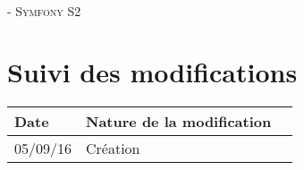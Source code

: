 \documentclass[asi, sansVersion]{picInsa}
\begin{document}
	\begin{center}
		\LARGE
		\textsc{
			\FF{}\\
			 - Symfony S2
		}
	\end{center}
	\vspace{0.5cm}

	\section*{Suivi des modifications}
		\begin{table}[H]
			\centering
			\begin{tabularx}{18cm}{|p{1.7cm}|X|p{4cm}|}
				\hline
				\rowcolor[gray]{0.90} Date & Nature de la modification \\
				\hline
				
				05/09/16 & Création \\
				\hline
			\end{tabularx}
		\end{table}
\end{document}
